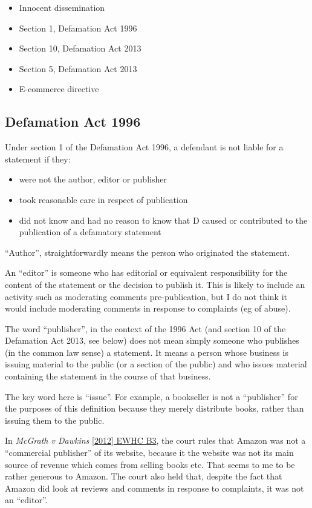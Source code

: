 \documentclass[]{article}
\begin{document}
\begin{itemize}
\item Innocent dissemination
\item Section 1, Defamation Act 1996
\item Section 10, Defamation Act 2013
\item Section 5, Defamation Act 2013
\item E-commerce directive
\end{itemize}

\subsection{Defamation Act 1996}

Under section 1 of the Defamation Act 1996, a defendant is not liable
for a statement if they:

\begin{itemize}
\item were not the author, editor or publisher
\item took reasonable care in respect of publication
\item did not know and had no reason to know that D caused or contributed to
  the publication of a defamatory statement
\end{itemize}

``Author'', straightforwardly means the person who originated the statement. 

An ``editor'' is someone who has editorial or equivalent responsibility for the content of the statement or the decision to publish it. This is likely to include an activity such as moderating comments pre-publication, but I do not think it would include moderating comments in response to complaints (eg of abuse). 

The word ``publisher'', in the context of the 1996 Act (and section 10 of the Defamation Act 2013, see below) does not mean simply someone who publishes (in the common law sense) a statement. It means a person whose business is issuing material to the public (or a section of the public) and who issues material containing the statement in the course of that business.

The key word here is ``issue''. For example, a bookseller is not a ``publisher'' for the purposes of this definition because they merely distribute books, rather than issuing them to the public. 

In {\it McGrath v Dawkins} \href{http://www.bailii.org/ew/cases/EWHC/QB/2012/B3.html}{[2012] EWHC B3}, the court rules that Amazon was not a ``commercial publisher'' of its website, because it the website was not its main source of revenue which comes from selling books etc. That seems to me to be rather generous to Amazon. The court also held that, despite the fact that Amazon did look at reviews and comments in response to complaints, it was not an ``editor''.
\end{document}
